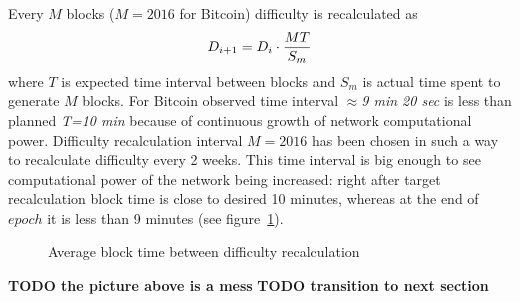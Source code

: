 \documentclass[]{llncs}
\begin{document}

Every \(M\) blocks (\(M=2016\) for Bitcoin) difficulty is recalculated as
\begin{equation}
D_{i+1}=D_i \cdot {MT\over S_m}
\end{equation}
where \(T\) is expected time interval between blocks and \(S_m\) is actual time spent to generate \(M\) blocks.
For Bitcoin observed time interval $\approx$\textit{9 min 20 sec} is less than planned \textit{T=10 min} because of continuous growth of network computational power.
Difficulty recalculation interval \(M=2016\) has been chosen in such a way to recalculate difficulty every 2 weeks.
This time interval is big enough to see computational power of the network being increased: right after target recalculation block time is close to desired 10 minutes, whereas at the end of \(epoch\) it is less than 9 minutes (see figure~\ref{fig:image}).

\begin{figure}[H]
\caption{Average block time between difficulty recalculation}
\label{fig:image}
\end{figure}

\textbf{TODO the picture above is a mess}
\textbf{TODO transition to next section}
\end{document}
